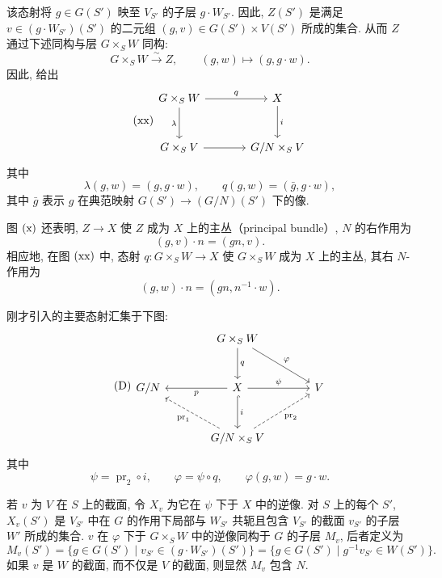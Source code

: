 该态射将 \(g\in G(S')\) 映至 \(V_{S'}\) 的子层 \(g\cdot W_{S'}\). 因此, \(Z(S')\) 是满足 \(v\in (g\cdot W_{S'})(S')\) 的二元组 \((g,v)\in G(S')\times V(S')\) 所成的集合. 从而 \(Z\) 通过下述同构与层 \(G\times_S W\) 同构:
\[
  G\times_S W \xrightarrow{\sim} Z,\qquad
  (g,w)\longmapsto(g,g\cdot w).
\]
因此, 给出
\[
\tag{xx}\label{sga3:xiii:equation:xx}
\begin{tikzcd}[column sep=large,row sep=large]
G\times_S W \arrow[r,"q"] \arrow[d,"\lambda"'] &
  X \arrow[d,"i"] \\
G\times_S V \arrow[r] & G/N\times_S V
\end{tikzcd}
\]
其中
\[
  \lambda(g,w)=(g,g\cdot w),\qquad
  q(g,w)=(\bar g,g\cdot w),
\]
其中 \(\bar g\) 表示 \(g\) 在典范映射 \(G(S')\to(G/N)(S')\) 下的像.

图 \(\SGARefLink{sga3:xiii:equation:x}{\mathrm{(x)}}\) 还表明, \(Z\to X\) 使 \(Z\) 成为 \(X\) 上的主丛（principal bundle）, \(N\) 的右作用为
\[
  (g,v)\cdot n=(gn,v).
\]
相应地, 在图 \(\SGARefLink{sga3:xiii:equation:xx}{\mathrm{(xx)}}\) 中, 态射 \(q:G\times_S W\to X\) 使 \(G\times_S W\) 成为 \(X\) 上的主丛, 其右 \(N\)-作用为
\[
  (g,w)\cdot n=(gn,n^{-1}\cdot w).
\]

刚才引入的主要态射汇集于下图:
\[
\tag{D}\label{sga3:xiii:equation:d}
\begin{tikzcd}[column sep=large,row sep=large]
& G\times_S W \arrow[d,"q"] \arrow[dr,"\varphi"] & \\
G/N &
X \arrow[l,"p"] \arrow[r,"\psi"] \arrow[d,hook,"i"] &
V \\
& G/N\times_S V
  \arrow[ul,dashed,"\operatorname{pr}_1"]
  \arrow[ur,dashed,"\operatorname{pr}_2"'] &
\end{tikzcd}
\]
其中
\[
  \psi=\operatorname{pr}_2\circ i,\qquad
  \varphi=\psi\circ q,\qquad
  \varphi(g,w)=g\cdot w.
\]

若 \(v\) 为 \(V\) 在 \(S\) 上的截面, 令 \(X_v\) 为它在 \(\psi\) 下于 \(X\) 中的逆像. 对 \(S\) 上的每个 \(S'\), \(X_v(S')\) 是 \(V_{S'}\) 中在 \(G\) 的作用下局部与 \(W_{S'}\) 共轭且包含 \(V_{S'}\) 的截面 \(v_{S'}\) 的子层 \(W'\) 所成的集合. \(v\) 在 \(\varphi\) 下于 \(G\times_S W\) 中的逆像同构于 \(G\) 的子层 \(M_v\), 后者定义为
\[
  M_v(S')=
  \bigl\{g\in G(S')\mid v_{S'}\in(g\cdot W_{S'})(S')\bigr\}
  =
  \bigl\{g\in G(S')\mid g^{-1}v_{S'}\in W(S')\bigr\}.
\]
如果 \(v\) 是 \(W\) 的截面, 而不仅是 \(V\) 的截面, 则显然 \(M_v\) 包含 \(N\).

